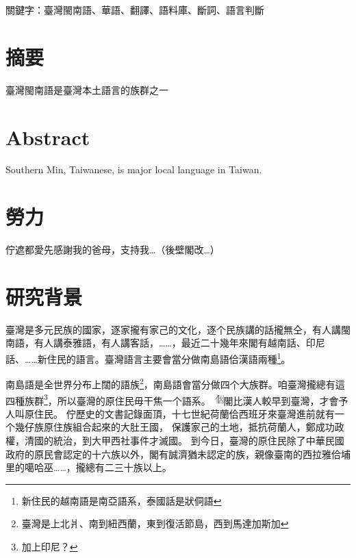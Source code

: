 \documentclass[final,oneside,onecolumn,12pt,a4paper]{book}%
\begin{document}
關鍵字：臺灣閩南語、華語、翻譯、語料庫、斷詞、語言判斷
\newpage

\chapter{摘要}
臺灣閩南語是臺灣本土語言的族群之一

\newpage

\chapter{Abstract}
Southern Min, Taiwanese, is major local language in Taiwan.

\newpage

\chapter{勞力}
佇遮都愛先感謝我的爸母，支持我…（後壁閣改…）

\newpage

\tableofcontents
\listoffigures
\listoftables

\mainmatter

\chapter{研究背景}
\label{章：研究背景}
臺灣是多元民族的國家，逐家攏有家己的文化，逐个民族講的話攏無仝，有人講閩南語，有人講泰雅語，有人講客話，……，最近二十幾年來閣有越南話、印尼話、……新住民的語言。臺灣語言主要會當分做南島語佮漢語兩種\footnote{新住民的越南語是南亞語系，泰國話是狀侗語}。

南島語是全世界分布上闊的語族\footnote{臺灣是上北爿、南到紐西蘭，東到復活節島，西到馬達加斯加}，南島語會當分做四个大族群\cite{臺灣原住民史李壬癸}。咱臺灣攏總有這四種族群\footnote{加上印尼？}，所以臺灣的原住民毋干焦一个語系。
\includegraphics[height=1em]{字/⿰因}閣比漢人較早到臺灣，才會予人叫原住民。
佇歷史的文書記錄面頂，十七世紀荷蘭佮西班牙來臺灣進前就有一个幾仔族原住族組合起來的大肚王國\cite{大肚王國}，
保護家己的土地，抵抗荷蘭人，鄭成功政權，清國的統治，到大甲西社事件才滅國。
到今日，臺灣的原住民除了中華民國政府的原民會認定的十六族以外，閣有誠濟猶未認定的族，親像臺南的西拉雅佮埔里的噶哈巫……，攏總有二三十族以上。
\end{document}
